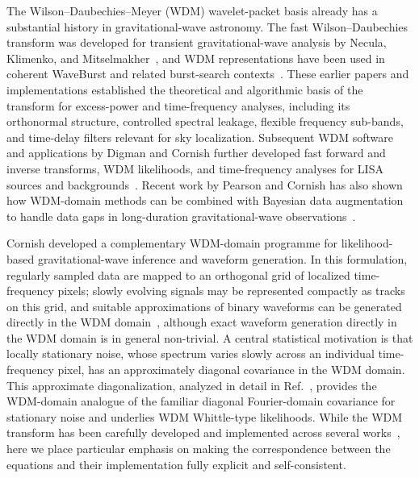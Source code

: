 \documentclass[twocolumn,preprintnumbers,
  superscriptaddress,
  nofootinbib,
  amsmath,
  amssymb,
  aps,
  prd,
  colorlinks=true,
  linkcolor=blue,
  urlcolor=blue,
  citecolor=blue,
  anchorcolor=blue
]{revtex4-2}
\begin{document}
The Wilson--Daubechies--Meyer (WDM) wavelet-packet basis already has a substantial history in gravitational-wave astronomy.  The fast Wilson--Daubechies transform was developed for transient gravitational-wave analysis by Necula, Klimenko, and Mitselmakher~\cite{Necula_2012}, and WDM representations have been used in coherent WaveBurst and related burst-search contexts~\cite{2023PhRvD.107f2002S, 2021SoftX..1400678D,Anderson:2000yy,Klimenko:2004qh}.
These earlier papers and implementations established the theoretical and algorithmic basis of the transform for excess-power and time-frequency analyses, including its orthonormal structure, controlled spectral leakage, flexible frequency sub-bands, and time-delay filters relevant for sky localization.  Subsequent WDM software and applications by Digman and Cornish further developed fast forward and inverse transforms, WDM likelihoods, and time-frequency analyses for LISA sources and backgrounds~\cite{2023ascl.soft07037D, digman_cornish_bbh_wdm,digman_cornish_tv_galactic_wdm}. Recent work by Pearson and Cornish has also shown how WDM-domain methods can be combined with Bayesian data augmentation to handle data gaps in long-duration gravitational-wave observations~\cite{pearson_cornish_wdm_gaps}.

Cornish developed a complementary WDM-domain programme for likelihood-based gravitational-wave inference and waveform generation. In this formulation, regularly sampled data are mapped to an orthogonal grid of localized time-frequency pixels; slowly evolving signals may be represented compactly as tracks on this grid, and suitable approximations of binary waveforms can be generated directly in the WDM domain~\cite{Cornish:2020odn}, although exact waveform generation directly in the WDM domain is in general non-trivial.
A central statistical motivation is that locally stationary noise, whose spectrum varies slowly across an individual time-frequency pixel, has an approximately diagonal covariance in the WDM domain. This approximate diagonalization, analyzed in detail in Ref.~\cite{cornish_nonstationary_wdm}, provides the WDM-domain analogue of the familiar diagonal Fourier-domain covariance for stationary noise and underlies WDM Whittle-type likelihoods.
While the WDM transform has been carefully developed and implemented across several works~\cite{Cornish_WDM_Transform,Digman_WDMWaveletTransforms,Moore_WDM_GW_wavelets,cWB_software,Farr:2025wdm}, here we place particular emphasis on making the correspondence between the equations and their implementation fully explicit and self-consistent.
\end{document}

